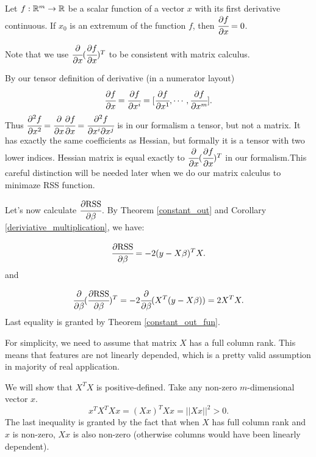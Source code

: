 \documentclass[main.tex]{subfiles}
\begin{document}
\begin{theorem}
\label{local_minimum_necessary}
Let $f:\mathbb{R}^m \to \mathbb{R}$ be a scalar function of a vector $x$ with its first derivative continuous.
If $x_0$ is an extremum of the function $f$, then $\cfrac{\partial f}{\partial x} = 0$.
\end{theorem}
Note that we use $\cfrac{\partial}{\partial x}(\cfrac{\partial f}{\partial x})^T$ to be consistent with matrix calculus. 

By our tensor definition of derivative (in a numerator layout)
$$
\cfrac{\partial f}{\partial x} = 
 \cfrac{\partial f}{\partial x^i} = [\cfrac{\partial f}{\partial x^1}, \cdots, \cfrac{\partial f}{\partial x^m}].
$$
Thus $\cfrac{\partial^2 f}{\partial x^2} = \cfrac{\partial}{\partial x} \cfrac{\partial f}{\partial x} = \cfrac{\partial^2 f}{\partial x^i \partial x^j}$ is in our formalism a tensor, but not a matrix. It has exactly the same coefficients as Hessian, but formally it is a tensor with two lower indices. Hessian matrix is equal exactly to $\cfrac{\partial}{\partial x}(\cfrac{\partial f}{\partial x})^T$ in our formalism.This careful distinction will be needed later when we do our matrix calculus to minimaze RSS function.

Let's now calculate $\cfrac{\partial \text{RSS}}{\partial \beta}$. By Theorem \ref{constant_out} and Corollary \ref{deriviative_multiplication}, we have:

\begin{equation}
    \cfrac{\partial \text{RSS}}{\partial \beta} =  - 2(y - X\beta)^T X.
\end{equation}
and

\begin{equation}
     \cfrac{\partial}{\partial \beta}(\cfrac{\partial \text{RSS}}{\partial \beta})^T
     = -2 \cfrac{\partial}{\partial \beta} (X^T (y - X\beta))
     = 2X^T X.
\end{equation}
Last equality is granted by Theorem \ref{constant_out_fun}.

For simplicity, we need to assume that matrix $X$ has a full column rank. This means that features are not linearly depended, which is a pretty valid assumption in majority of real application.

We will show that $X^T X$ is positive-defined. Take any non-zero $m$-dimensional vector $x$.
\begin{equation}
    x^T X^T X x = (Xx)^T Xx = ||Xx||^2 > 0.
\end{equation}
The last inequality is granted by the fact that when $X$ has full column rank and $x$ is non-zero, $Xx$ is also non-zero (otherwise columns would have been linearly dependent).
\end{document}
